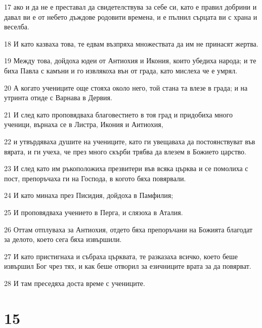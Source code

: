 \par 17 ако и да не е преставал да свидетелствува за себе си, като е правил добрини и давал ви е от небето дъждове родовити времена, и е пълнил сърцата ви с храна и веселба.
\par 18 И като казваха това, те едвам възпряха множествата да им не принасят жертва.
\par 19 Между това, дойдоха юдеи от Антиохия и Икония, които убедиха народа; и те биха Павла с камъни и го извлякоха вън от града, като мислеха че е умрял.
\par 20 А когато учениците още стояха около него, той стана та влезе в града; и на утринта отиде с Варнава в Дервия.
\par 21 И след като проповядваха благовестието в тоя град и придобиха много ученици, върнаха се в Листра, Икония и Аитиохия,
\par 22 и утвърдяваха душите на учениците, като ги увещаваха да постоянствуват във вярата, и ги учеха, че през много скърби трябва да влезем в Божието царство.
\par 23 И след като им ръкоположиха презвитери във всяка църква и се помолиха с пост, препоръчаха ги на Господа, в когото бяха повярвали.
\par 24 И като минаха през Писидия, дойдоха в Памфилия;
\par 25 И проповядваха учението в Перга, и слязоха в Аталия.
\par 26 Оттам отплуваха за Антиохия, отдето бяха препоръчани на Божията благодат за делото, което сега бяха извършили.
\par 27 И като пристигнаха и събраха църквата, те разказаха всичко, което беше извършил Бог чрез тях, и как беше отворил за езичниците врата за да повярват.
\par 28 И там преседяха доста време с учениците.

\chapter{15}

